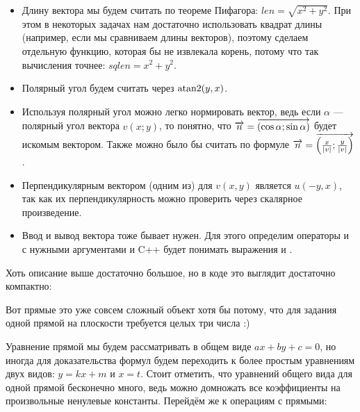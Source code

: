 \begin{itemize}
    \item Длину вектора мы будем считать по теореме Пифагора: $len = \sqrt{x^2 + y^2}$. При этом в некоторых задачах нам достаточно использовать квадрат длины (например, если мы сравниваем длины векторов), поэтому сделаем отдельную функцию, которая бы не извлекала корень, потому что так вычисления точнее: $sqlen = x^2 + y^2$.
    \item Полярный угол будем считать через $\operatorname{atan2}(y, x)$.
    \item Используя полярный угол можно легко нормировать вектор, ведь если $\alpha$ — полярный угол вектора $v(x; y)$, то понятно, что $\overrightarrow{n} = \overrightarrow{(\cos \alpha; \sin \alpha)}$ будет искомым вектором. Также можно было бы считать по формуле $\overrightarrow{n} = \overrightarrow{\left(\frac{x}{|v|}; \frac{y}{|v|}\right)}$.
    \item Перпендикулярным вектором (одним из) для $v(x, y)$ является $u(-y, x)$, так как их перпендикулярность можно проверить через скалярное произведение.
    \item Ввод и вывод вектора тоже бывает нужен. Для этого определим операторы \lcpp{>>} и \lcpp{<<} с нужными аргументами и C++ будет понимать выражения  и .
\end{itemize}

Хоть описание выше достаточно большое, но в коде это выглядит достаточно компактно:

\nocode


Вот прямые это уже совсем сложный объект хотя бы потому, что для задания одной прямой на плоскости требуется целых три числа :)

Уравнение прямой мы будем рассматривать в общем виде $a x + b y + c = 0$, но иногда для доказательства формул будем переходить к более простым уравнениям двух видов: $y = k x + m$ и $x = t$. Стоит отметить, что уравнений общего вида для одной прямой бесконечно много, ведь можно домножать все коэффициенты на произвольные ненулевые константы. Перейдём же к операциям с прямыми:

